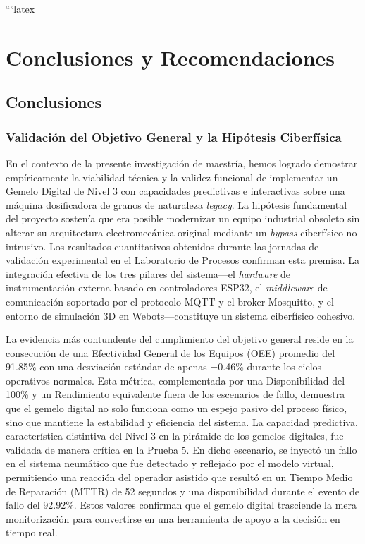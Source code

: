 ```latex
\chapter{Conclusiones y Recomendaciones}
\label{chap:conclusiones}

\section{Conclusiones}

\subsection{Validación del Objetivo General y la Hipótesis Ciberfísica}
En el contexto de la presente investigación de maestría, hemos logrado demostrar empíricamente la viabilidad técnica y la validez funcional de implementar un Gemelo Digital de Nivel 3 con capacidades predictivas e interactivas sobre una máquina dosificadora de granos de naturaleza \textit{legacy}. La hipótesis fundamental del proyecto sostenía que era posible modernizar un equipo industrial obsoleto sin alterar su arquitectura electromecánica original mediante un \textit{bypass} ciberfísico no intrusivo. Los resultados cuantitativos obtenidos durante las jornadas de validación experimental en el Laboratorio de Procesos confirman esta premisa. La integración efectiva de los tres pilares del sistema—el \textit{hardware} de instrumentación externa basado en controladores ESP32, el \textit{middleware} de comunicación soportado por el protocolo MQTT y el broker Mosquitto, y el entorno de simulación 3D en Webots—constituye un sistema ciberfísico cohesivo.

La evidencia más contundente del cumplimiento del objetivo general reside en la consecución de una Efectividad General de los Equipos (OEE) promedio del 91.85\% con una desviación estándar de apenas ±0.46\% durante los ciclos operativos normales. Esta métrica, complementada por una Disponibilidad del 100\% y un Rendimiento equivalente fuera de los escenarios de fallo, demuestra que el gemelo digital no solo funciona como un espejo pasivo del proceso físico, sino que mantiene la estabilidad y eficiencia del sistema. La capacidad predictiva, característica distintiva del Nivel 3 en la pirámide de los gemelos digitales, fue validada de manera crítica en la Prueba 5. En dicho escenario, se inyectó un fallo en el sistema neumático que fue detectado y reflejado por el modelo virtual, permitiendo una reacción del operador asistido que resultó en un Tiempo Medio de Reparación (MTTR) de 52 segundos y una disponibilidad durante el evento de fallo del 92.92\%. Estos valores confirman que el gemelo digital trasciende la mera monitorización para convertirse en una herramienta de apoyo a la decisión en tiempo real.

